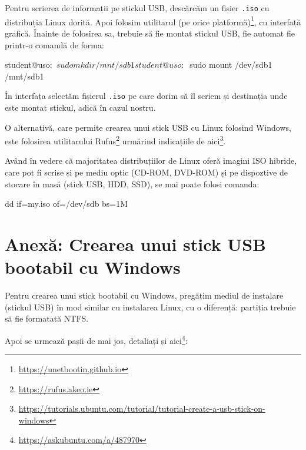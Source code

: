 Pentru scrierea de informații pe stickul USB, descărcăm un fișier \texttt{.iso}
cu distribuția
Linux dorită. Apoi folosim utilitarul  (pe orice
platformă)\footnote{\url{https://unetbootin.github.io}}, cu interfață grafică.
Înainte de folosirea sa, trebuie să fie montat stickul USB, fie automat fie
printr-o comandă de forma:

\begin{screen}
student@uso:~$ sudo mkdir /mnt/sdb1
student@uso:~$ sudo mount /dev/sdb1 /mnt/sdb1
\end{screen}

În interfața  selectăm fișierul \texttt{.iso} pe care dorim să îl scriem și
destinația unde este montat stickul, adică  în cazul nostru.

O alternativă, care permite crearea unui stick USB cu Linux folosind Windows,
este folosirea utilitarului Rufus\footnote{\url{https://rufus.akeo.ie}} urmărind
indicațiile de
aici\footnote{\url{https://tutorials.ubuntu.com/tutorial/tutorial-create-a-usb-stick-on-windows}}.

Având în vedere că majoritatea distribuțiilor de Linux oferă imagini ISO hibride, care pot fi scrise
și pe mediu optic (CD-ROM, DVD-ROM) și pe dispoztive de stocare în masă (stick USB, HDD, SSD), se mai poate folosi comanda:
\begin{screen}
  dd if=my.iso of=/dev/sdb bs=1M
\end{screen}

\section{Anexă: Crearea unui stick USB bootabil cu Windows}
\label{sec:boot:usb-windows}

Pentru crearea unui stick bootabil cu Windows, pregătim mediul de instalare
(stickul USB) în mod similar cu instalarea Linux, cu o diferență: partiția
trebuie să fie formatată NTFS.

Apoi se urmează pașii de mai jos, detaliați și
aici\footnote{\url{https://askubuntu.com/a/487970}}:

